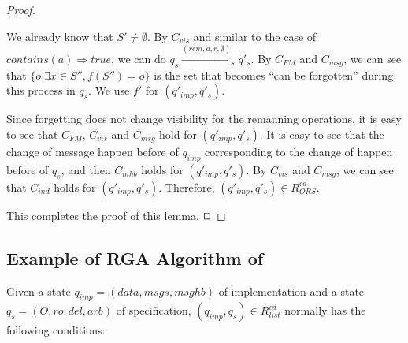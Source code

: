 \begin {proof}
\begin{itemize}
    We already know that $S' \neq \emptyset$. By $C_{\mathit{vis}}$ and similar to the case of $\mathit{contains}(a) \Rightarrow \mathit{true}$, we can do $q_s \xrightarrow{( \mathit{rem},a,r,\emptyset )}_s q'_s$. By $C_{\mathit{FM}}$ and $C_{\mathit{msg}}$, we can see that $\{ o \vert \exists x \in S'', f(S'') = o \}$ is the set that becomes ``can be forgotten'' during this process in $q_s$. We use $f'$ for $(q'_{\mathit{imp}},q'_s)$.

    Since forgetting does not change visibility for the remanning operations, it is easy to see that $C_{\mathit{FM}}$, $C_{\mathit{vis}}$ and $C_{\mathit{msg}}$ hold for $(q'_{\mathit{imp}},q'_s)$. It is easy to see that the change of message happen before of $q_{\mathit{imp}}$ corresponding to the change of happen before of $q_s$, and then $C_{\mathit{mhb}}$ holds for $(q'_{\mathit{imp}},q'_s)$. By $C_{\mathit{vis}}$ and $C_{\mathit{msg}}$, we can see that $C_{\mathit{ind}}$ holds for $(q'_{\mathit{imp}},q'_s)$. Therefore, $(q'_{\mathit{imp}},q'_s) \in R_{\mathit{ORS}}^{\mathit{cd}}$.
\end{itemize}

This completes the proof of this lemma. $\qed$
\end {proof}








\subsection{Example of RGA Algorithm of \cite{Attiya:2016}}
\label{subsec:example of rga algorithm that assumes causal delivery}


Given a state $q_{\mathit{imp}} = (\mathit{data},\mathit{msgs},\mathit{msghb})$ of implementation and a state $q_s = (O,\mathit{ro},\mathit{del},\mathit{arb})$ of specification, $(q_{\mathit{imp}},q_s) \in R_{\mathit{list}}^{\mathit{cd}}$ normally has the following conditions:


